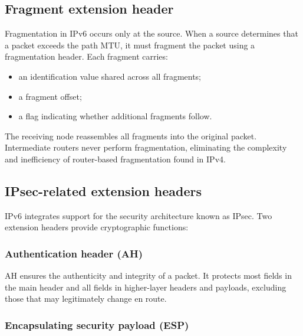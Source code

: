 \begin{center}
\end{center}

\begin{center}
\end{center}

\subsection{Fragment extension header}

Fragmentation in IPv6 occurs only at the source. When a source determines that a packet exceeds the path MTU, it must fragment the packet using a fragmentation header. Each fragment carries:

\begin{itemize}
\item an identification value shared across all fragments;
\item a fragment offset;
\item a flag indicating whether additional fragments follow.
\end{itemize}

The receiving node reassembles all fragments into the original packet. Intermediate routers never perform fragmentation, eliminating the complexity and inefficiency of router-based fragmentation found in IPv4.

\subsection{IPsec-related extension headers}

IPv6 integrates support for the security architecture known as IPsec. Two extension headers provide cryptographic functions:

\subsubsection*{Authentication header (AH)}

AH ensures the authenticity and integrity of a packet. It protects most fields in the main header and all fields in higher-layer headers and payloads, excluding those that may legitimately change en route.

\subsubsection*{Encapsulating security payload (ESP)}

